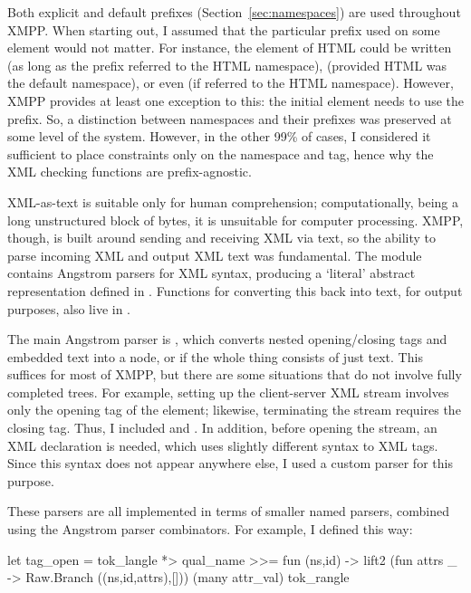\documentclass[12pt,a4paper,twoside,openright]{report}
\begin{document}
{Both explicit and default prefixes (Section~\ref{sec:namespaces}) are used throughout XMPP. When starting out, I assumed that the particular prefix used on some element would not matter. For instance, the  element of HTML could be written  (as long as the  prefix referred to the HTML namespace),  (provided HTML was the default namespace), or even  (if  referred to the HTML namespace). However, XMPP provides at least one exception to this: the initial  element needs to use the  prefix. So, a distinction between namespaces and their prefixes was preserved at some level of the system. However, in the other 99\% of cases, I considered it sufficient to place constraints only on the namespace and tag, hence why the XML checking functions are prefix-agnostic.

XML-as-text is suitable only for human comprehension; computationally, being a long unstructured block of bytes, it is unsuitable for computer processing. XMPP, though, is built around sending and receiving XML via text, so the ability to parse incoming XML and output XML text was fundamental. The  module contains Angstrom parsers for XML syntax, producing a `literal' abstract representation defined in . Functions for converting this back into text, for output purposes, also live in .

The main Angstrom parser is , which converts nested opening/closing tags and embedded text into a  node, or  if the whole thing consists of just text. This suffices for most of XMPP, but there are some situations that do not involve fully completed trees. For example, setting up the client-server XML stream involves only the opening tag of the  element; likewise, terminating the stream requires the closing tag. Thus, I included  and . In addition, before opening the stream, an XML declaration  is needed, which uses slightly different syntax to XML tags. Since this syntax does not appear anywhere else, I used a custom parser for this purpose.

These parsers are all implemented in terms of smaller named parsers, combined using the Angstrom parser combinators. For example, I defined  this way:

\begin{ocaml}
let tag_open =
  tok_langle *> qual_name >>= fun (ns,id) ->
    lift2 (fun attrs _ -> Raw.Branch ((ns,id,attrs),[]))
      (many attr_val)
      tok_rangle
\end{ocaml}

}
\end{document}
